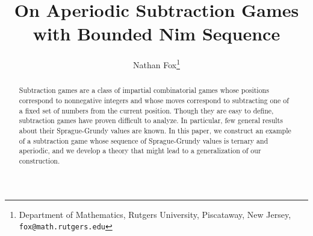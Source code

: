 \documentclass[english,12pt]{article}
\begin{document}
%
%
\title{On Aperiodic Subtraction Games with Bounded Nim Sequence}
\author{Nathan Fox\footnote{Department of Mathematics, Rutgers University, Piscataway, New Jersey,
\texttt{fox@math.rutgers.edu}
}}
\date{}

\maketitle

\begin{abstract}
Subtraction games are a class of impartial combinatorial games whose positions correspond to nonnegative integers and whose moves correspond to subtracting one of a fixed set of numbers from the current position.  Though they are easy to define, subtraction games have proven difficult to analyze.  In particular, few general results about their Sprague-Grundy values are known.  In this paper, we construct an example of a subtraction game whose sequence of Sprague-Grundy values is ternary and aperiodic, and we develop a theory that might lead to a generalization of our construction.
\end{abstract}
\end{document}
